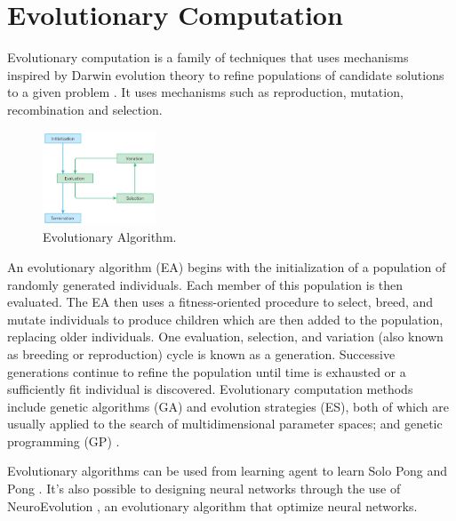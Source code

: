 \section{Evolutionary Computation}
\label{sec:evolutionary-computation}
Evolutionary computation is a family of techniques that uses mechanisms inspired by Darwin evolution theory to refine populations of candidate solutions to a given problem \cite{vikhar2016evolutionary}. It uses mechanisms such as reproduction, mutation, recombination and selection.

\begin{figure}[ht]
    \centering
    \includegraphics[width=0.3\textwidth]{images/Evolutionary_algorithms.jpg}
    \caption{Evolutionary Algorithm.}
\end{figure}

An evolutionary algorithm (EA) begins with the initialization of a population of randomly generated individuals. Each member of this population is then evaluated. 
The EA then uses a fitness-oriented procedure to select, breed, and mutate individuals to produce children which are then added to the population, replacing older individuals. 
One evaluation, selection, and variation (also known as breeding or reproduction) cycle is known as a generation. 
Successive generations continue to refine the population until time is exhausted or a sufficiently fit individual is discovered. 
Evolutionary computation methods include genetic algorithms (GA) and evolution strategies (ES), both of which are usually applied to the search of multidimensional parameter spaces; 
and genetic programming (GP) \cite{panait2005cooperative} \cite{vikhar2016evolutionary}.

Evolutionary algorithms can be used from learning agent to learn Solo Pong \cite{langdon2005evolutionary} and Pong \cite{mcbrien2020learning}.
It's also possible to designing neural networks through the use of NeuroEvolution \cite{stanley2019designing}, an evolutionary algorithm that optimize neural networks.
